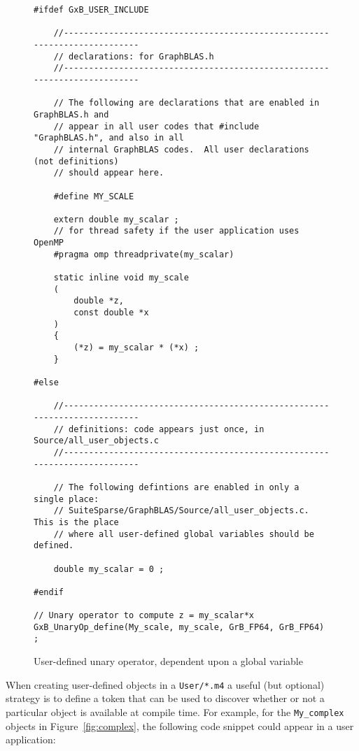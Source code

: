 \documentclass[12pt]{article}
\begin{document}
\begin{figure}
\begin{mdframed}[leftmargin=-0.4in,userdefinedwidth=5.8in]
{\footnotesize
\begin{verbatim}
#ifdef GxB_USER_INCLUDE

    //--------------------------------------------------------------------------
    // declarations: for GraphBLAS.h
    //--------------------------------------------------------------------------

    // The following are declarations that are enabled in GraphBLAS.h and
    // appear in all user codes that #include "GraphBLAS.h", and also in all
    // internal GraphBLAS codes.  All user declarations (not definitions)
    // should appear here.

    #define MY_SCALE

    extern double my_scalar ;
    // for thread safety if the user application uses OpenMP
    #pragma omp threadprivate(my_scalar)

    static inline void my_scale
    (
        double *z,
        const double *x
    )
    {
        (*z) = my_scalar * (*x) ;
    }

#else

    //--------------------------------------------------------------------------
    // definitions: code appears just once, in Source/all_user_objects.c
    //--------------------------------------------------------------------------

    // The following defintions are enabled in only a single place:
    // SuiteSparse/GraphBLAS/Source/all_user_objects.c.  This is the place
    // where all user-defined global variables should be defined.

    double my_scalar = 0 ;

#endif

// Unary operator to compute z = my_scalar*x
GxB_UnaryOp_define(My_scale, my_scale, GrB_FP64, GrB_FP64) ; \end{verbatim}}
\end{mdframed}
\caption{User-defined unary operator, dependent upon a global variable
\label{fig:scale}}
\end{figure}

When creating user-defined objects in a \verb'User/*.m4' a useful (but
optional) strategy is to define a token that can be used to discover whether or
not a particular object is available at compile time.  For example, for the
\verb'My_complex' objects in Figure~\ref{fig:complex}, the following code
snippet could appear in a user application:
\end{document}
